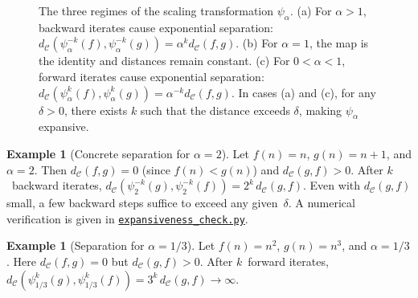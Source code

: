 \documentclass[11pt,a4paper]{article}
\newcommand{\repourl}{https://github.com/guydev42/expansive-homeomorphisms-complexity-qmetric}
\theoremstyle{plain}
\theoremstyle{definition}
\newtheorem{exampleinner}[theoreminner]{Example}
\newenvironment{example}[1][]{\begin{exampleinner}[#1]}{\end{exampleinner}}
\newcommand{\C}{\mathcal{C}}
\begin{document}
\begin{figure}[H]
\vspace{0.2cm}
\caption{The three regimes of the scaling transformation $\psi_\alpha$. 
(a) For $\alpha>1$, backward iterates cause exponential separation: 
$d_\C(\psi_\alpha^{-k}(f),\psi_\alpha^{-k}(g)) = \alpha^k d_\C(f,g)$. 
(b) For $\alpha=1$, the map is the identity and distances remain constant. 
(c) For $0<\alpha<1$, forward iterates cause exponential separation: 
$d_\C(\psi_\alpha^k(f),\psi_\alpha^k(g)) = \alpha^{-k} d_\C(f,g)$. 
In cases (a) and (c), for any $\delta>0$, there exists $k$ such that the 
distance exceeds $\delta$, making $\psi_\alpha$ expansive.}
\label{fig:three-cases}
\end{figure}

\begin{example}[Concrete separation for $\alpha=2$]\label{ex:concrete-sep}
Let $f(n)=n$, $g(n)=n+1$, and $\alpha=2$.  Then $d_\C(f,g)=0$
(since $f(n)<g(n)$) and $d_\C(g,f)>0$.  After $k$~backward
iterates, $d_\C(\psi_2^{-k}(g),\psi_2^{-k}(f))=2^k\,d_\C(g,f)$.
Even with $d_\C(g,f)$ small, a few backward steps suffice to
exceed any given~$\delta$.  A numerical verification is given in
\href{\repourl/blob/main/code/python/expansiveness_check.py}{\texttt{expansiveness\_check.py}}.
\end{example}

\begin{example}[Separation for $\alpha=1/3$]\label{ex:sep-third}
Let $f(n)=n^2$, $g(n)=n^3$, and $\alpha=1/3$.  Here
$d_\C(f,g)=0$ but $d_\C(g,f)>0$.  After $k$~forward iterates,
$d_\C(\psi_{1/3}^k(g),\psi_{1/3}^k(f))=3^k\,d_\C(g,f)\to\infty$.
\end{example}
\end{document}
